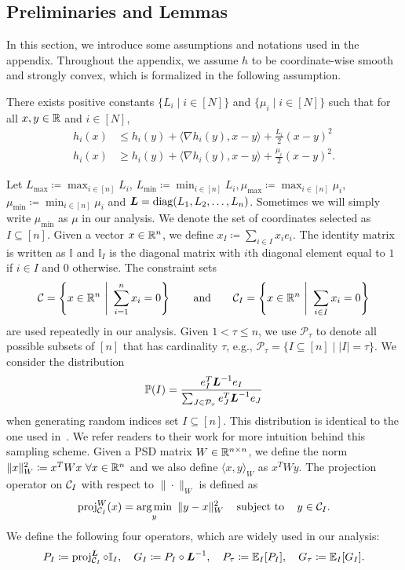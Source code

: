 \subsection{Preliminaries and Lemmas} \label{appendix:lemmas}
In this section, we introduce some assumptions and notations used in the appendix. 
Throughout the appendix, we assume $h$ to be coordinate-wise smooth and strongly convex, which is formalized in the following assumption. 
\begin{assumption} \label{ass:hStruncture} 
  There exists positive constants $\{L_i \mid i \in [N]\}$ and $\{\mu_i \mid i \in [N]\}$ such that for all $x,y \in \mathbb{R}$ and $i \in [N]$, 
  \begin{align}
      h_i(x) &\leq h_i(y) + \langle \nabla h_i(y), x - y \rangle + \frac{L_i}{2} (x - y)^2 \tag{smoothnes}
      \\ h_i(x) &\geq h_i(y) + \langle \nabla h_i(y), x - y \rangle + \frac{\mu_i}{2} (x - y)^2 \tag{strong convexity}.
  \end{align}
\end{assumption}

Let $L_{\max} \coloneqq \max_{i \in [n]} L_i$, $L_{\min} \coloneqq \min_{i \in [n]} L_i, \mu_{\max} \coloneqq \max_{i \in [n]} \mu_i$, $\mu_{\min} \coloneqq \min_{i \in [n]} \mu_i$ and $\boldsymbol{L} = \operatorname{diag}(L_1, L_2, \ldots, L_n)$. Sometimes we will simply write $\mu_{\min}$ as $\mu$ in our analysis. 
We denote the set of coordinates selected as $I \subseteq [n]$. Given a vector $x \in \mathbb{R}^n$, we define $x_I \coloneqq \sum_{i \in I} x_i e_i $. The identity matrix is written as $\mathbb{I}$ and $\mathbb{I}_I$ is the diagonal matrix with $i$th diagonal element equal to $1$ if $i \in I$ and $0$ otherwise. The constraint sets
\[
    \mathcal{C} = \left\{x\in\mathbb{R}^n ~\Bigg|~ \sum_{i=1}^n x_i=0\right\} \quad \hbox{\quad and\quad} \quad \mathcal{C}_I=\left\{x\in\mathbb{R}^n ~\Bigg|~ \sum_{i\in I}x_i = 0\right\}
\]
are used repeatedly in our analysis. Given $1 < \tau \leq n$, we use $\mathcal{P}_\tau$ to denote all possible subsets of $[n]$ that has cardinality $\tau$, e.g., $\mathcal{P}_\tau = \{ I \subseteq [n] \mid |I| = \tau \}$. We consider the distribution
\[
    \mathbb{P}(I) = \frac{e_I^T\boldsymbol{L}^{-1}e_I}{\sum_{J \in \mathcal{P}_\tau} e_J^T\boldsymbol{L}^{-1}e_J}
\]
when generating random indices set $I \subseteq [n]$. This distribution is identical to the one used in~\citet{necoara2017random}. We refer readers to their work for more intuition behind this sampling scheme. Given a PSD matrix $W\in \mathbb{R}^{n \times n}$, we define the norm $\|x\|_W^2 \coloneqq x^T W x~\forall x \in \mathbb{R}^{n}$ and we also define $\langle x,y \rangle_{W}$ as $x^T W y$. The projection operator on $\mathcal{C}_I$ with respect to $\|\cdot\|_W$ is defined as
\[
    \operatorname{proj}_{\mathcal{C}_I}^{W}(x) = \underset{y}{\textrm{arg}\,{\min}}\enskip \|y-x\|_W^2 \enspace\enspace\mathop{\hbox{\rm subject to}}\enspace\enspace y \in \mathcal{C}_I.
\]
We define the following four operators, which are widely used in our analysis:
\[
    P_I \coloneqq \operatorname{proj}_{\mathcal{C}_I}^{\boldsymbol{L}} \circ \mathbb{I}_I, \quad  G_I \coloneqq P_I \circ \boldsymbol{L}^{-1}, \quad P_\tau \coloneqq \mathbb{E}_I [P_I], \quad G_\tau \coloneqq \mathbb{E}_I [G_I].
\]

